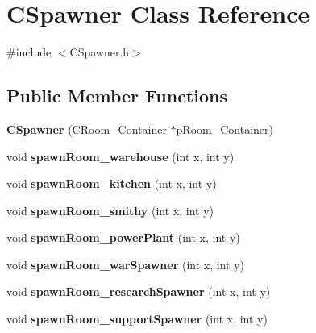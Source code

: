 \hypertarget{classCSpawner}{\section{C\-Spawner Class Reference}
\label{classCSpawner}
}


{\ttfamily \#include $<$C\-Spawner.\-h$>$}

\subsection*{Public Member Functions}
\begin{DoxyCompactItemize}
\item 
\hypertarget{classCSpawner_a72b2b6ec16e6f78685c4412c821942ba}{{\bfseries C\-Spawner} (\hyperlink{classCRoom__Container}{C\-Room\-\_\-\-Container} $\ast$p\-Room\-\_\-\-Container)}\label{classCSpawner_a72b2b6ec16e6f78685c4412c821942ba}

\item 
\hypertarget{classCSpawner_a6af5e85072a0bad2defa58c810de4033}{void {\bfseries spawn\-Room\-\_\-warehouse} (int x, int y)}\label{classCSpawner_a6af5e85072a0bad2defa58c810de4033}

\item 
\hypertarget{classCSpawner_a9fc39b2d9ae306f72398229cea2d741c}{void {\bfseries spawn\-Room\-\_\-kitchen} (int x, int y)}\label{classCSpawner_a9fc39b2d9ae306f72398229cea2d741c}

\item 
\hypertarget{classCSpawner_a8e242710ae356d20b01d75d905f83725}{void {\bfseries spawn\-Room\-\_\-smithy} (int x, int y)}\label{classCSpawner_a8e242710ae356d20b01d75d905f83725}

\item 
\hypertarget{classCSpawner_a09a3c3bceb8a6f7303ececfadbc32c3f}{void {\bfseries spawn\-Room\-\_\-power\-Plant} (int x, int y)}\label{classCSpawner_a09a3c3bceb8a6f7303ececfadbc32c3f}

\item 
\hypertarget{classCSpawner_a3a5b332d5d7c66d1c5c7734c6eac1408}{void {\bfseries spawn\-Room\-\_\-war\-Spawner} (int x, int y)}\label{classCSpawner_a3a5b332d5d7c66d1c5c7734c6eac1408}

\item 
\hypertarget{classCSpawner_ab7ef6e33e3da9e605df24f9fdceb3624}{void {\bfseries spawn\-Room\-\_\-research\-Spawner} (int x, int y)}\label{classCSpawner_ab7ef6e33e3da9e605df24f9fdceb3624}

\item 
\hypertarget{classCSpawner_aca2f0d7df3ad16e8730d881cdefd3549}{void {\bfseries spawn\-Room\-\_\-support\-Spawner} (int x, int y)}\label{classCSpawner_aca2f0d7df3ad16e8730d881cdefd3549}

\end{DoxyCompactItemize}


